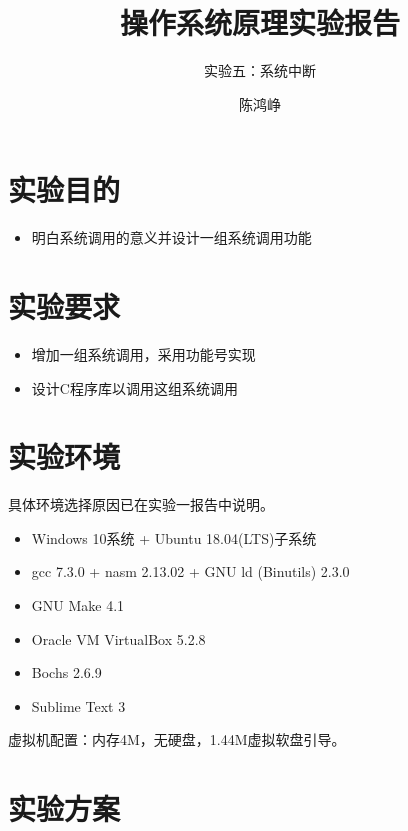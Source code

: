 \documentclass[logo,reportComp]{thesis}
\title{操作系统原理实验报告}
\subtitle{实验五：系统中断}
\author{陈鸿峥}
\begin{document}
\maketitle

\section{实验目的}
\begin{itemize}
	\item 明白系统调用的意义并设计一组系统调用功能
\end{itemize}

\section{实验要求}
\begin{itemize}
	\item 增加一组系统调用，采用功能号实现
	\item 设计C程序库以调用这组系统调用
\end{itemize}

\section{实验环境}
具体环境选择原因已在实验一报告中说明。
\begin{itemize}
	\item Windows 10系统 + Ubuntu 18.04(LTS)子系统
	\item gcc 7.3.0 + nasm 2.13.02 + GNU ld (Binutils) 2.3.0
    \item GNU Make 4.1
	\item Oracle VM VirtualBox 5.2.8
    \item Bochs 2.6.9
	\item Sublime Text 3
\end{itemize}

虚拟机配置：内存4M，无硬盘，1.44M虚拟软盘引导。

\section{实验方案}
\end{document}
